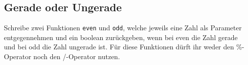 \subsection{Gerade oder Ungerade }
Schreibe zwei Funktionen \texttt{even} und \texttt{odd}, welche jeweils eine Zahl
als Parameter entgegennehmen und ein boolean zurückgeben, wenn bei even die Zahl
gerade und bei odd die Zahl ungerade ist. Für diese Funktionen dürft ihr weder den \%-Operator noch den /-Operator nutzen.
